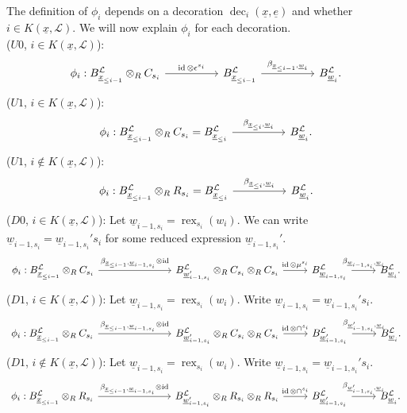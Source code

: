 \documentclass{amsart}
\newcommand{\scrL}{\mathcal{L}}
\DeclareMathOperator{\id}{id}
\DeclareMathOperator{\rex}{rex}
\DeclareMathOperator{\dec}{dec}
\newcommand{\ue}{\underline{e}}
\newcommand{\uw}{\underline{w}}
\newcommand{\ux}{\underline{x}}
\theoremstyle{definition}
\numberwithin{equation}{subsection}
\begin{document}
The definition of $\phi_i$ depends on a decoration $\dec_i (\ux, \ue)$ and whether $i \in K(\ux, \scrL)$.
We will now explain $\phi_i$ for each decoration.\\
($U0$, $i \in K(\ux, \scrL)$): 
\[
    \begin{tikzcd}
        \phi_i : B_{\ux_{\leq i-1}}^{\scrL} \otimes_R C_{s_i} \arrow[rr, "\id \otimes \epsilon^{s_i}"] &  &  B_{\ux_{\leq i-1}}^{\scrL} \arrow[rr, "{\beta_{\ux_{\leq i-1}, \uw_i}}"] &  &  B_{\uw_i}^{\scrL}.
    \end{tikzcd}
\]
($U1$, $i \in K(\ux, \scrL)$):
\[
    \begin{tikzcd}
        \phi_i : B_{\ux_{\leq i-1}}^{\scrL} \otimes_R C_{s_i} = B_{\ux_{\leq i}}^{\scrL} \arrow[rr, "{\beta_{\ux_{\leq i}, \uw_i}}"] &  & B_{\uw_i}^{\scrL}.
    \end{tikzcd}
\]
($U1$, $i \notin K(\ux, \scrL)$):
\[
    \begin{tikzcd}
        \phi_i : B_{\ux_{\leq i-1}}^{\scrL} \otimes_R R_{s_i} = B_{\ux_{\leq i}}^{\scrL} \arrow[rr, "{\beta_{\ux_{\leq i}, \uw_i}}"] &  & B_{\uw_i}^{\scrL}.
    \end{tikzcd}
\]
($D0$, $i \in K(\ux, \scrL)$): Let $\uw_{i-1, s_i} = \rex_{s_i} (w_i)$. We can write $\uw_{i-1, s_i} = \uw_{i-1, s_i}' s_i$ for some reduced expression $\uw_{i-1, s_i}'$.
\[
    \begin{tikzcd}
        \phi_i : B_{\ux_{\leq i-1}}^{\scrL} \otimes_R C_{s_i} \arrow[rrr, "{\beta_{\ux_{\leq i-1}, \uw_{i-1, s_i}} \otimes \id}"] & & & {B_{\uw_{i-1, s_i}'}^{\scrL} \otimes_R C_{s_i} \otimes_R C_{s_i}} \arrow[r, "\id \otimes \mu^{s_i}"]  & {B_{\uw_{i-1, s_i}}^{\scrL}} \arrow[r, "{\beta_{\uw_{i-1, s_i}, \uw_i}}"] &  B_{\uw_i}^{\scrL}.
    \end{tikzcd}
\]
($D1$, $i \in K(\ux, \scrL)$): Let $\uw_{i-1, s_i} = \rex_{s_i} (w_i)$. Write $\uw_{i-1, s_i} = \uw_{i-1, s_i}' s_i$.
\[ 
    \begin{tikzcd}
        \phi_i : B_{\ux_{\leq i-1}}^{\scrL} \otimes_R C_{s_i} \arrow[rrr, "{\beta_{\ux_{\leq i-1}, \uw_{i-1, s_i}} \otimes \id}"] &  & & {B_{\uw_{i-1, s_i}'}^{\scrL} \otimes_R C_{s_i} \otimes_R C_{s_i}} \arrow[r, "\id \otimes \cap^{s_i}"]  & {B_{\uw_{i-1, s_i}'}^{\scrL}} \arrow[r, "{\beta_{\uw_{i-1, s_i}', \uw_i}}"] &  B_{\uw_i}^{\scrL}.
    \end{tikzcd}
\]
($D1$, $i \notin K(\ux, \scrL)$): Let $\uw_{i-1, s_i} = \rex_{s_i} (w_i)$. Write $\uw_{i-1, s_i} = \uw_{i-1, s_i}' s_i$.
\[
    \begin{tikzcd}
        \phi_i : B_{\ux_{\leq i-1}}^{\scrL} \otimes_R R_{s_i} \arrow[rrr, "{\beta_{\ux_{\leq i-1}, \uw_{i-1, s_i}} \otimes \id}"] &  &  & {B_{\uw_{i-1, s_i}'}^{\scrL} \otimes_R R_{s_i} \otimes_R R_{s_i}} \arrow[r, "\id \otimes \cap^{s_i}"] & {B_{\uw_{i-1, s_i}'}^{\scrL}} \arrow[r, "{\beta_{\uw_{i-1, s_i}', \uw_i}}"] &  B_{\uw_i}^{\scrL}.
    \end{tikzcd}
\]
\end{document}
